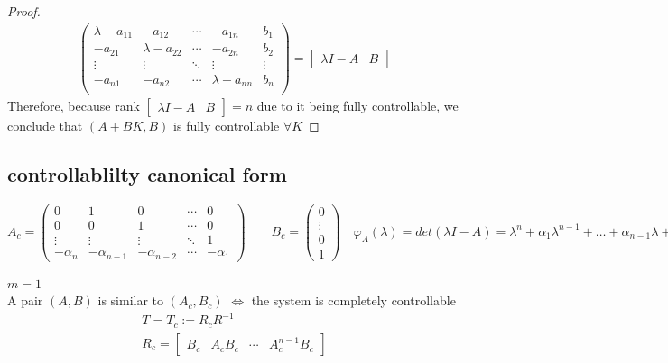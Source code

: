\documentclass[english]{lectures}
\begin{document}
\begin{proof}
\begin{gather*}
\begin{pmatrix}
            \lambda-a_{11} & -a_{12}& \cdots & -a_{1n} & b_1\\
            -a_{21} & \lambda-a_{22}& \cdots & -a_{2n} & b_2\\
            \vdots & \vdots & \ddots & \vdots & \vdots\\
            -a_{n1} & -a_{n2}& \cdots & \lambda-a_{nn} & b_n\\
        \end{pmatrix}=\begin{bmatrix}
            \lambda I -A & B
        \end{bmatrix}
    \end{gather*}
    Therefore, because rank \( \begin{bmatrix}
        \lambda I -A & B
    \end{bmatrix}=n \) due to it being fully controllable, we conclude that \((A+BK,B)\) is fully controllable $\forall K$
\end{proof}
\subsection{controllablilty canonical form}
\[
A_c=\begin{pmatrix}
    0 & 1 & 0 & \cdots & 0 \\
    0 & 0  & 1 & \cdots & 0 \\
    \vdots & \vdots & \vdots & \ddots & 1\\
    -\alpha_n & -\alpha_{n-1} & -\alpha_{n-2}& \cdots & -\alpha_1
\end{pmatrix} \qquad B_c=\begin{pmatrix}
    0 \\ \vdots \\ 0 \\1
\end{pmatrix} \quad \varphi_A(\lambda)=det(\lambda I-A)=\lambda^n+\alpha_1\lambda^{n-1}+\dots+\alpha_{n-1}\lambda +\alpha_n
\]

\begin{theorem}
    $m=1$\\
    A pair $(A,B)$ is similar to $(A_c,B_c)$ $\iff$ the system is completely controllable
    \begin{gather*}
        T=T_c:=R_cR^{-1}\\
        R_c=\begin{bmatrix}
            B_c & A_cB_c & \cdots & A_c^{n-1}B_c
            \end{bmatrix}
    \end{gather*}

\end{theorem}
\end{document}
